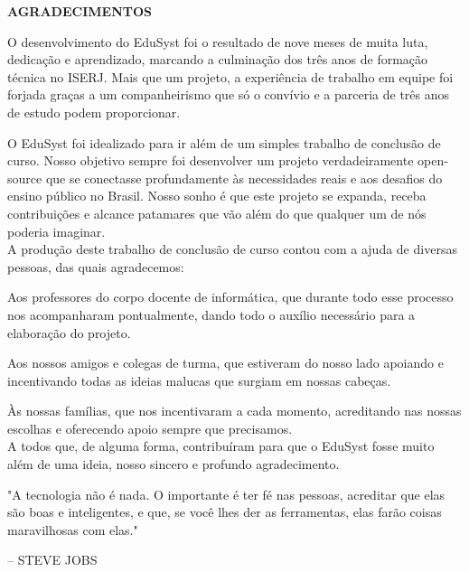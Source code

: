 \documentclass[main.tex]{subfiles}
\begin{document}
\begin{titlepage}

\begin{center}
    \large
    \textbf{\MakeUppercase{Agradecimentos}}
\end{center}

O desenvolvimento do EduSyst foi o resultado de nove meses de muita luta, dedicação e aprendizado, marcando a culminação dos três anos de formação técnica no ISERJ. Mais que um projeto, a experiência de trabalho em equipe foi forjada graças a um companheirismo que só o convívio e a parceria de três anos de estudo podem proporcionar.

O EduSyst foi idealizado para ir além de um simples trabalho de conclusão de curso. Nosso objetivo sempre foi desenvolver um projeto verdadeiramente open-source que se conectasse profundamente às necessidades reais e aos desafios do ensino público no Brasil. Nosso sonho é que este projeto se expanda, receba contribuições e alcance patamares que vão além do que qualquer um de nós poderia imaginar.
\\

A produção deste trabalho de conclusão de curso contou com a ajuda de diversas pessoas, das quais agradecemos:

Aos professores do corpo docente de informática, que durante todo esse processo nos acompanharam pontualmente, dando todo o auxílio necessário para a elaboração do projeto.

Aos nossos amigos e colegas de turma, que estiveram do nosso lado apoiando e incentivando todas as ideias malucas que surgiam em nossas cabeças. 

Às nossas famílias, que nos incentivaram a cada momento, acreditando nas nossas escolhas e oferecendo apoio sempre que precisamos.
\\

A todos que, de alguma forma, contribuíram para que o EduSyst fosse muito além de uma ideia, nosso sincero e profundo agradecimento.
\\

\vfill %

\begin{flushright}
    \begin{minipage}[t]{0.55\textwidth} %
        \raggedleft
        \begin{flushleft}
            \justify
            "A tecnologia não é nada. O importante é ter fé nas pessoas, acreditar que elas são boas e inteligentes, e que, se você lhes der as ferramentas, elas farão coisas maravilhosas com elas."
        \end{flushleft}
        \raggedleft
        -- STEVE JOBS
    \end{minipage}
\end{flushright}

\end{titlepage}
\end{document}
